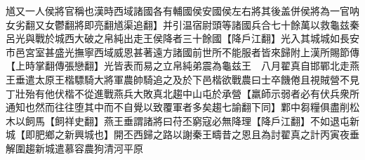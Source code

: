 馗又一人侯將官稱也漢時西域諸國各有輔國侯安國侯左右將其後盖併侯將為一官呐女劣翻又女鬱翻將即亮翻馗渠追翻】并引温宿尉頭等諸國兵合七十餘萬以救龜兹秦呂光與戰於城西大破之帛純出走王侯降者三十餘國【降戶江翻】光入其城城如長安市邑宮室甚盛光撫寧西域威恩甚著遠方諸國前世所不能服者皆來歸附上漢所賜節傳【上時掌翻傳張戀翻】光皆表而易之立帛純弟震為龜兹王　八月翟真自邯鄲北走燕王垂遣太原王楷驃騎大將軍農帥騎追之及於下邑楷欲戰農曰士卒饑倦且視賊營不見丁壯殆有他伏楷不從進戰燕兵大敗真北趨中山屯於承營【羸師示弱者必有伏兵衆所通知也然而往往堕其中而不自覺以致覆軍者多矣趨七諭翻下同】鄴中芻糧俱盡削松木以飼馬【飼祥史翻】燕王垂謂諸將曰苻丕窮寇必無降理【降戶江翻】不如退屯新城【即肥鄉之新興城也】開丕西歸之路以謝秦王疇昔之恩且為討翟真之計丙寅夜垂解圍趨新城遣慕容農狗清河平原